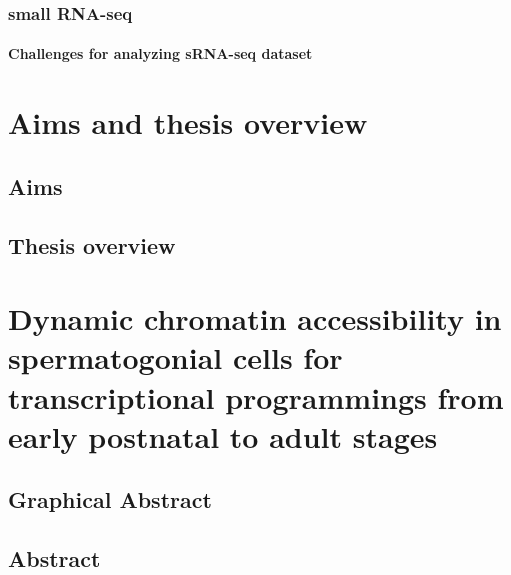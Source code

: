 \documentclass[12pt,twoside]{reedthesis}
\begin{document}
\hypertarget{small-rna-seq}{%
\subsection{small RNA-seq}\label{small-rna-seq}}

\hypertarget{challenges-for-analyzing-srna-seq-dataset}{%
\subsubsection{Challenges for analyzing sRNA-seq dataset}\label{challenges-for-analyzing-srna-seq-dataset}}

\hypertarget{aims}{%
\chapter*{Aims and thesis overview}\label{aims}}

\hypertarget{aims-1}{%
\section{Aims}\label{aims-1}}

\hypertarget{thesis-overview}{%
\section{Thesis overview}\label{thesis-overview}}

\hypertarget{developmental}{%
\chapter{Dynamic chromatin accessibility in spermatogonial cells for transcriptional programmings from early postnatal to adult stages}\label{developmental}}

\newpage

\hypertarget{graphical-abstract}{%
\section{Graphical Abstract}\label{graphical-abstract}}

\newpage

\hypertarget{abstract-1}{%
\section{Abstract}\label{abstract-1}}

\newpage
\end{document}
